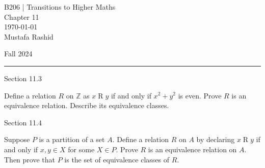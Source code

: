 \documentclass[12pt,letterpaper, onecolumn]{exam}
\begin{document}
	\begingroup  
	\noindent\LARGE B206 | Transitions to Higher Maths\\
	\noindent\LARGE Chapter 11\\
	\noindent\large \today\\
	\noindent\large Mustafa Rashid\par
	\noindent\large Fall 2024\par
	\endgroup
	\rule{\textwidth}{0.4pt}
	\pointsdroppedatright
	\printanswers
	\renewcommand{\solutiontitle}{\noindent\textbf{Ans:}\enspace}  
	\centerline{Section 11.3}
	\begin{questions}
	\setcounter{question}{7}\question Define a relation $R$ on $\mathbb{Z}$ as $x\mathrel{R}y$ if and only if $x^2+y^2$ is even. Prove $R$ is an equivalence relation. Describe its equivalence classes. 
	\end{questions}	
	\centerline{Section 11.4}
	\begin{questions}
		\setcounter{question}{3}\question Suppose $P$ is a partition of a set $A$. Define a relation $R$ on $A$ by declaring $x\mathrel{R}y$ if and only if $x,y\in X$ for some $X\in P$. Prove $R$ is an equivalence relation on $A$. Then prove that $P$ is the set of equivalence classes of $R$.
		\end{questions}
\end{document}
